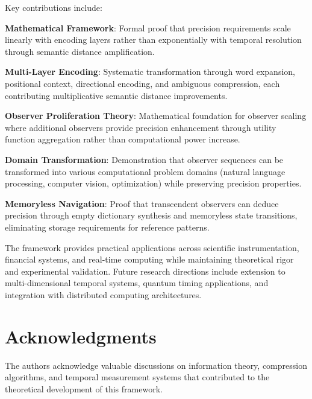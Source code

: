 \documentclass[12pt,a4paper]{article}
\begin{document}
Key contributions include:

\textbf{Mathematical Framework}: Formal proof that precision requirements scale linearly with encoding layers rather than exponentially with temporal resolution through semantic distance amplification.

\textbf{Multi-Layer Encoding}: Systematic transformation through word expansion, positional context, directional encoding, and ambiguous compression, each contributing multiplicative semantic distance improvements.

\textbf{Observer Proliferation Theory}: Mathematical foundation for observer scaling where additional observers provide precision enhancement through utility function aggregation rather than computational power increase.

\textbf{Domain Transformation}: Demonstration that observer sequences can be transformed into various computational problem domains (natural language processing, computer vision, optimization) while preserving precision properties.

\textbf{Memoryless Navigation}: Proof that transcendent observers can deduce precision through empty dictionary synthesis and memoryless state transitions, eliminating storage requirements for reference patterns.

The framework provides practical applications across scientific instrumentation, financial systems, and real-time computing while maintaining theoretical rigor and experimental validation. Future research directions include extension to multi-dimensional temporal systems, quantum timing applications, and integration with distributed computing architectures.

\section*{Acknowledgments}

The authors acknowledge valuable discussions on information theory, compression algorithms, and temporal measurement systems that contributed to the theoretical development of this framework.
\end{document}
